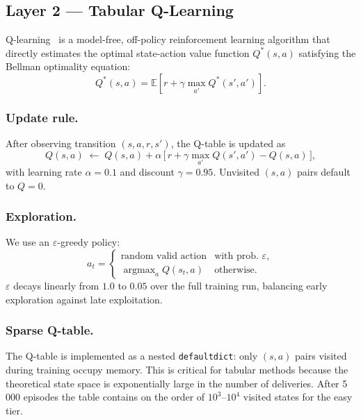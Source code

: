 \documentclass[11pt,twocolumn]{article}
\newcommand{\argmax}{\operatorname{argmax}}
\begin{document}
\subsection{Layer 2 --- Tabular Q-Learning}
\label{sec:qlearning}

Q-learning~\cite{watkins1992} is a model-free, off-policy reinforcement
learning algorithm that directly estimates the optimal state-action value
function $Q^*(s,a)$ satisfying the Bellman optimality equation:
\begin{equation}
    Q^*(s,a) = \mathbb{E}\!\left[r + \gamma \max_{a'} Q^*(s',a')\right].
\end{equation}

\subsubsection{Update rule.}
After observing transition $(s, a, r, s')$, the Q-table is updated as
\begin{equation}
    Q(s,a) \;\leftarrow\; Q(s,a) + \alpha\,\bigl[\,r + \gamma
    \max_{a'} Q(s',a') - Q(s,a)\,\bigr],
    \label{eq:qupdate}
\end{equation}
with learning rate $\alpha = 0.1$ and discount $\gamma = 0.95$.
Unvisited $(s,a)$ pairs default to $Q = 0$.

\subsubsection{Exploration.}
We use an $\varepsilon$-greedy policy:
\begin{equation}
    a_t = \begin{cases}
        \text{random valid action} & \text{with prob.\ } \varepsilon, \\
        \argmax_{a} Q(s_t, a) & \text{otherwise.}
    \end{cases}
\end{equation}
$\varepsilon$ decays linearly from $1.0$ to $0.05$ over the full
training run, balancing early exploration against late exploitation.

\subsubsection{Sparse Q-table.}
The Q-table is implemented as a nested \texttt{defaultdict}: only
$(s,a)$ pairs visited during training occupy memory.
This is critical for tabular methods because the theoretical state space
is exponentially large in the number of deliveries.
After 5\,000 episodes the table contains on the order of $10^3$--$10^4$
visited states for the easy tier.
\end{document}
